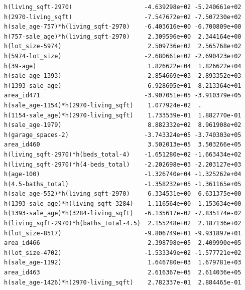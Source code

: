 \documentclass[
]{article}
\begin{document}
\begin{verbatim}
h(living_sqft-2970)                    -4.639298e+02 -5.240661e+02
h(2970-living_sqft)                    -7.547672e+02 -7.507230e+02
h(sale_age-757)*h(living_sqft-2970)    -6.403616e+00 -6.700809e+00
h(757-sale_age)*h(living_sqft-2970)     2.309596e+00  2.344164e+00
h(lot_size-5974)                        2.509736e+02  2.565768e+02
h(5974-lot_size)                       -2.680661e+02 -2.690423e+02
h(39-age)                               1.826622e+04  1.826622e+04
h(sale_age-1393)                       -2.854669e+03 -2.893352e+03
h(1393-sale_age)                        6.928695e+01  8.213364e+01
area_id471                             -3.907051e+05 -3.910379e+05
h(sale_age-1154)*h(2970-living_sqft)    1.077924e-02  .           
h(1154-sale_age)*h(2970-living_sqft)    1.733539e-01  1.882770e-01
h(sale_age-1979)                        8.882332e+02  8.961908e+02
h(garage_spaces-2)                     -3.743324e+05 -3.740303e+05
area_id460                              3.502013e+05  3.503266e+05
h(living_sqft-2970)*h(beds_total-4)    -1.651280e+02 -1.663434e+02
h(living_sqft-2970)*h(4-beds_total)    -2.202698e+03 -2.203127e+03
h(age-100)                             -1.326740e+04 -1.325262e+04
h(4.5-baths_total)                     -1.358232e+05 -1.361165e+05
h(sale_age-552)*h(living_sqft-2970)     6.334531e+00  6.631375e+00
h(1393-sale_age)*h(living_sqft-3284)    1.116564e+00  1.153634e+00
h(1393-sale_age)*h(3284-living_sqft)   -6.135617e-02 -7.835174e-02
h(living_sqft-2970)*h(baths_total-4.5)  2.155248e+02  2.187136e+02
h(lot_size-8517)                       -9.806749e+01 -9.931897e+01
area_id466                              2.398798e+05  2.409990e+05
h(lot_size-4702)                       -1.533349e+02 -1.577721e+02
h(sale_age-1192)                        1.646780e+03  1.679781e+03
area_id463                              2.616367e+05  2.614036e+05
h(sale_age-1426)*h(2970-living_sqft)    2.782337e-01  2.884465e-01
                                                                  

\end{verbatim}
\end{document}
